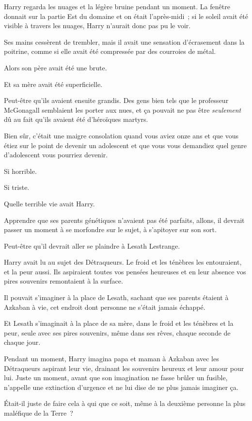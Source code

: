 Harry regarda les nuages et la légère bruine pendant un moment. La fenêtre donnait sur la partie Est du domaine et on était l'après-midi~; si le soleil avait été visible à travers les nuages, Harry n'aurait donc pas pu le voir.

Ses mains cessèrent de trembler, mais il avait une sensation d'écrasement dans la poitrine, comme si elle avait été compressée par des courroies de métal.

Alors son père avait été une brute.

Et sa mère avait été superficielle.

Peut-être qu'ils avaient ensuite grandis. Des gens bien tels que le professeur McGonagall semblaient les porter aux nues, et ça pouvait ne pas être \emph{seulement} dû au fait qu'ils avaient été d'héroïques martyrs.

Bien sûr, c'était une maigre consolation quand vous aviez onze ans et que vous étiez sur le point de devenir un adolescent et que vous vous demandiez quel genre d'adolescent vous pourriez devenir.

Si horrible.

Si triste.

Quelle terrible vie avait Harry.

Apprendre que ses parents génétiques n'avaient pas été parfaits, allons, il devrait passer un moment à se morfondre sur le sujet, à s'apitoyer sur son sort.

Peut-être qu'il devrait aller se plaindre à Lesath Lestrange.

Harry avait lu au sujet des Détraqueurs. Le froid et les ténèbres les entouraient, et la peur aussi. Ils aspiraient toutes vos pensées heureuses et en leur absence vos pires souvenirs remontaient à la surface.

Il pouvait s'imaginer à la place de Lesath, sachant que ses parents étaient à Azkaban à vie, cet endroit dont personne ne s'était jamais échappé.

Et Lesath s'imaginait à la place de sa mère, dans le froid et les ténèbres et la peur, seule avec ses pires souvenirs, même dans ses rêves, chaque seconde de chaque jour.

Pendant un moment, Harry imagina papa et maman à Azkaban avec les Détraqueurs aspirant leur vie, drainant les souvenirs heureux et leur amour pour lui. Juste un moment, avant que son imagination ne fasse brûler un fusible, n'appelle une extinction d'urgence et ne lui dise de ne plus jamais imaginer ça.

Était-il juste de faire cela à qui que ce soit, même à la deuxième personne la plus maléfique de la Terre~?

